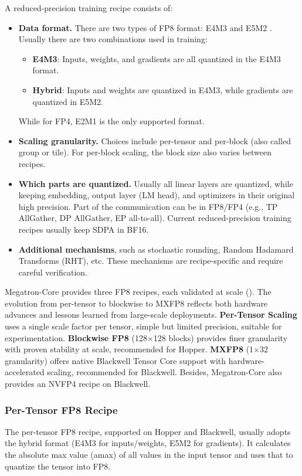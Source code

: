 \documentclass[10pt,logo,copyright]{nvidiatechreport}
\begin{document}
A reduced-precision training recipe consists of:
\begin{itemize}
    \item \textbf{Data format.} There are two types of FP8 format: E4M3 and E5M2 \cite{micikevicius2022fp8formatsdeeplearning,kuzmin2022fp8quantization}. Usually there are two combinations used in training:
    \begin{itemize}
        \item \textbf{E4M3}: Inputs, weights, and gradients are all quantized in the E4M3 format.
        \item \textbf{Hybrid}: Inputs and weights are quantized in E4M3, while gradients are quantized in E5M2.
    \end{itemize}
    While for FP4, E2M1 is the only supported format.
    \item \textbf{Scaling granularity.} Choices include per-tensor and per-block (also called group or tile). For per-block scaling, the block size also varies between recipes.
    \item \textbf{Which parts are quantized.} Usually all linear layers are quantized, while keeping embedding, output layer (LM head), and optimizers in their original high precision. Part of the communication can be in FP8/FP4 (e.g., TP AllGather, DP AllGather, EP all-to-all). Current reduced-precision training recipes usually keep SDPA in BF16.
    \item \textbf{Additional mechanisms}, such as stochastic rounding, Random Hadamard Transforms (RHT), etc. These mechanisms are recipe-specific and require careful verification. 
\end{itemize}

Megatron-Core provides three FP8 recipes, each validated at scale (). The evolution from per-tensor to blockwise to MXFP8 reflects both hardware advances and lessons learned from large-scale deployments. \textbf{Per-Tensor Scaling} uses a single scale factor per tensor, simple but limited precision, suitable for experimentation. \textbf{Blockwise FP8} (128$\times$128 blocks) provides finer granularity with proven stability at scale, recommended for Hopper. \textbf{MXFP8} (1$\times$32 granularity) offers native Blackwell Tensor Core support with hardware-accelerated scaling, recommended for Blackwell. Besides, Megatron-Core also provides an NVFP4 recipe \cite{nvidia2025pretraininglargelanguagemodels} on Blackwell.

\subsubsection{Per-Tensor FP8 Recipe}
The per-tensor FP8 recipe, supported on Hopper and Blackwell, usually adopts the hybrid format (E4M3 for inputs/weights, E5M2 for gradients). It calculates the absolute max value (amax) of all values in the input tensor and uses that to quantize the tensor into FP8.
\end{document}
